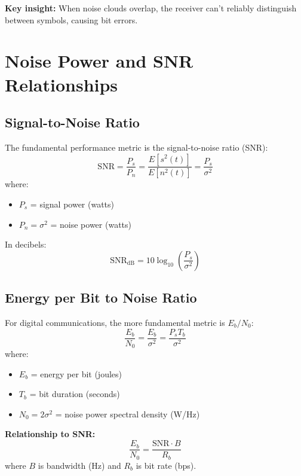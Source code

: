 \textbf{Key insight:} When noise clouds overlap, the receiver can't reliably distinguish between symbols, causing bit errors.

\section{Noise Power and SNR Relationships}

\subsection{Signal-to-Noise Ratio}

The fundamental performance metric is the signal-to-noise ratio (SNR):
\begin{equation}
\mathrm{SNR} = \frac{P_s}{P_n} = \frac{E[s^2(t)]}{E[n^2(t)]} = \frac{P_s}{\sigma^2}
\end{equation}
where:
\begin{itemize}
\item $P_s$ = signal power (watts)
\item $P_n = \sigma^2$ = noise power (watts)
\end{itemize}

In decibels:
\begin{equation}
\mathrm{SNR}_{\mathrm{dB}} = 10\log_{10}\left(\frac{P_s}{\sigma^2}\right)
\end{equation}

\subsection{Energy per Bit to Noise Ratio}

For digital communications, the more fundamental metric is $E_b/N_0$:
\begin{equation}
\frac{E_b}{N_0} = \frac{E_b}{\sigma^2} = \frac{P_s T_b}{\sigma^2}
\end{equation}
where:
\begin{itemize}
\item $E_b$ = energy per bit (joules)
\item $T_b$ = bit duration (seconds)
\item $N_0 = 2\sigma^2$ = noise power spectral density (W/Hz)
\end{itemize}

\textbf{Relationship to SNR:}
\begin{equation}
\frac{E_b}{N_0} = \frac{\mathrm{SNR} \cdot B}{R_b}
\end{equation}
where $B$ is bandwidth (Hz) and $R_b$ is bit rate (bps).

